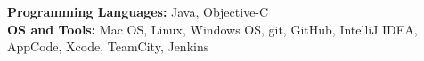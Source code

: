 

\begin{cvparagraph}

\textbf{Programming Languages:} Java, Objective-C
\\
\textbf{OS and Tools:} Mac OS, Linux, Windows OS, git, GitHub, IntelliJ IDEA, AppCode, Xcode, TeamCity, Jenkins

\end{cvparagraph}
